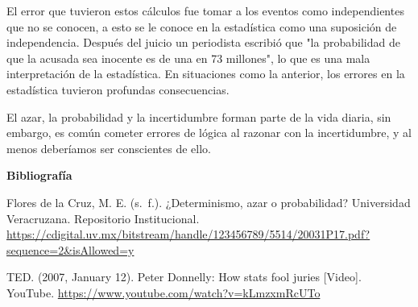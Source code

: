 \documentclass{article}[12pt]
\begin{document}
    El error que tuvieron estos cálculos fue tomar a los eventos como independientes que no se conocen, a esto se le conoce en la estadística como una suposición de independencia. Después del juicio un periodista escribió que "la probabilidad de que la acusada sea inocente es de una en 73 millones", lo que es una mala interpretación de la estadística. En situaciones como la anterior, los errores en la estadística tuvieron profundas consecuencias.

    El azar, la probabilidad y la incertidumbre forman parte de la vida diaria, sin embargo, es común cometer errores de lógica al razonar con la incertidumbre, y al menos deberíamos ser conscientes de ello.
    
    \hfil \break
    \begin{flushleft}
        \large\textbf{Bibliografía}
    \end{flushleft}

    Flores de la Cruz, M. E. (s. f.). ¿Determinismo, azar o probabilidad? Universidad Veracruzana. Repositorio Institucional. \url{https://cdigital.uv.mx/bitstream/handle/123456789/5514/20031P17.pdf?sequence=2&isAllowed=y}

    \hfil \break
    TED. (2007, January 12). Peter Donnelly: How stats fool juries [Video]. YouTube. \url{https://www.youtube.com/watch?v=kLmzxmRcUTo}
\end{document}
